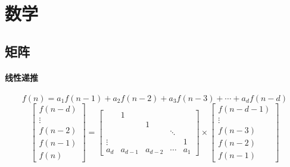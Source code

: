 \section{数学}
\subsection{矩阵}
\paragraph{线性递推}
\begin{equation*}
    f(n)=a_1f(n-1)+a_2f(n-2)+a_3f(n-3)+\cdots +a_df(n-d)
\end{equation*}
\begin{equation*}
    \left[
        \begin{matrix}
            f(n-d)\\
            \vdots\\
            f(n-2)\\
            f(n-1)\\
            f(n)
        \end{matrix}
    \right]
    =
    \left[
        \begin{matrix}
            &1\\
            &&1\\
            &&&\ddots\\
            \vdots&&&&1\\
            a_d&a_{d-1}&a_{d-2}&\cdots&a_1
        \end{matrix}
    \right]
    \times
    \left[
        \begin{matrix}
            f(n-d-1)\\
            \vdots\\
            f(n-3)\\
            f(n-2)\\
            f(n-1)
        \end{matrix}
    \right]
\end{equation*}
